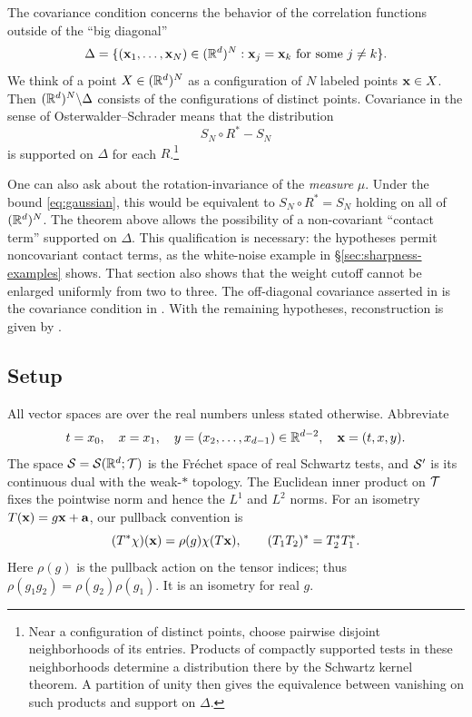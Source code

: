 \begin{remark*}
    The covariance condition concerns the behavior of the correlation functions outside of the ``big diagonal'' 
    \begin{equation}
        \Delta = \{(\mathbf{x}_1,\dots,\mathbf{x}_N) \in (\mathbb{R}^d)^N : \mathbf{x}_j=\mathbf{x}_k\text{ for some }j\neq k  \}.
    \end{equation}
    We think of a point $X\in (\mathbb{R}^d)^N$ as a configuration of $N$ labeled points $\mathbf{x}\in X$. Then $(\mathbb{R}^d)^N\backslash \Delta$ consists of the configurations of distinct points. 
    Covariance in the sense of Osterwalder--Schrader means that the distribution 
    \begin{equation}
        S_N\circ R^* -S_N
    \end{equation}
    is supported on $\Delta$ for each $R$.\footnote{
    Near a configuration of distinct points, choose pairwise disjoint neighborhoods of its entries. Products of compactly supported tests in these neighborhoods determine a distribution there by the Schwartz kernel theorem. A partition of unity then gives the equivalence between vanishing on such products and support on $\Delta$.
    }

    One can also ask about the rotation-invariance of the \emph{measure} $\mu$. Under the bound \cref{eq:gaussian}, this would be equivalent to $S_N\circ R^*=S_N$ holding on all of $(\mathbb{R}^d)^N$. The theorem above allows the possibility of a non-covariant ``contact term'' supported on $\Delta$. 
    This qualification is necessary: the hypotheses permit noncovariant contact terms, as the white-noise example in \S\ref{sec:sharpness-examples} shows. That section also shows that the weight cutoff cannot be enlarged uniformly from two to three. 
    The off-diagonal covariance asserted in  is the covariance condition in \cite[\S3, E1 and Remark~1]{OS}. With the remaining hypotheses, reconstruction is given by \cite[\S IV.1, Theorem $E'$ (or $E''$)$\to R'$]{OS2}. 
\end{remark*}

\subsection{Setup}
\label{subsec:setup}

All vector spaces are over the real numbers unless stated otherwise.
Abbreviate
\begin{equation}
 t=x_0,\quad x=x_1,\quad y=(x_2,\dots,x_{d-1})\in\mathbb{R}^{d-2},
 \quad \mathbf{x}=(t,x,y).
\end{equation}
The space $\mathcal{S}=\mathcal{S}(\mathbb{R}^d;\mathcal{T})$ is the Fr\'echet space of real
Schwartz tests, and $\mathcal{S}'$ is its continuous dual with the weak-$*$
topology. The Euclidean inner product on $\mathcal{T}$ fixes the pointwise norm
and hence the $L^1$ and $L^2$ norms.
For an isometry $T(\mathbf{x})=g\mathbf{x}+\mathbf{a}$, our pullback convention is
\begin{equation}\label{eq:pullback}
 (T^*\chi)(\mathbf{x})=\rho(g)\chi(T\mathbf{x}),\qquad
 (T_1T_2)^*=T_2^*T_1^*.
\end{equation}
Here $\rho(g)$ is the pullback action on the tensor indices; thus
$\rho(g_1g_2)=\rho(g_2)\rho(g_1)$. It is an isometry for real $g$.


